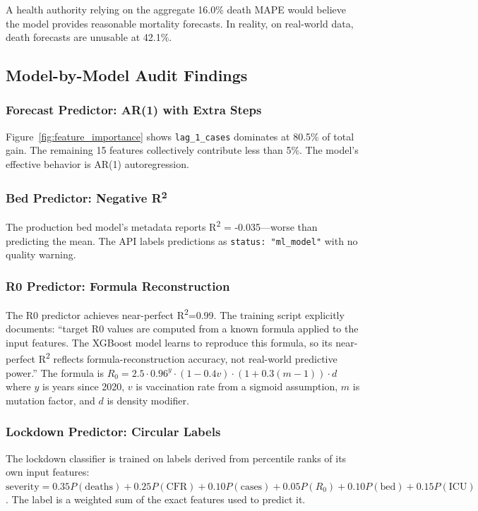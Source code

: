 \documentclass{ieeeaccess}
\begin{document}
A health authority relying on the aggregate 16.0\% death MAPE would believe the model provides reasonable mortality forecasts. In reality, on real-world data, death forecasts are unusable at 42.1\%.

\subsection{Model-by-Model Audit Findings}

\subsubsection{Forecast Predictor: AR(1) with Extra Steps}
Figure~\ref{fig:feature_importance} shows \texttt{lag\_1\_cases} dominates at 80.5\% of total gain. The remaining 15 features collectively contribute less than 5\%. The model's effective behavior is AR(1) autoregression.

\subsubsection{Bed Predictor: Negative R\textsuperscript{2}}
The production bed model's metadata reports R\textsuperscript{2} = -0.035---worse than predicting the mean. The API labels predictions as \texttt{status: "ml\_model"} with no quality warning.

\subsubsection{R0 Predictor: Formula Reconstruction}
The R0 predictor achieves near-perfect R\textsuperscript{2}=0.99. The training script explicitly documents: ``target R0 values are computed from a known formula applied to the input features. The XGBoost model learns to reproduce this formula, so its near-perfect R\textsuperscript{2} reflects formula-reconstruction accuracy, not real-world predictive power.'' The formula is $R_0 = 2.5 \cdot 0.96^y \cdot (1 - 0.4v) \cdot (1 + 0.3(m-1)) \cdot d$ where $y$ is years since 2020, $v$ is vaccination rate from a sigmoid assumption, $m$ is mutation factor, and $d$ is density modifier.

\subsubsection{Lockdown Predictor: Circular Labels}
The lockdown classifier is trained on labels derived from percentile ranks of its own input features: $\text{severity} = 0.35P(\text{deaths}) + 0.25P(\text{CFR}) + 0.10P(\text{cases}) + 0.05P(R_0) + 0.10P(\text{bed}) + 0.15P(\text{ICU})$. The label is a weighted sum of the exact features used to predict it.
\end{document}

